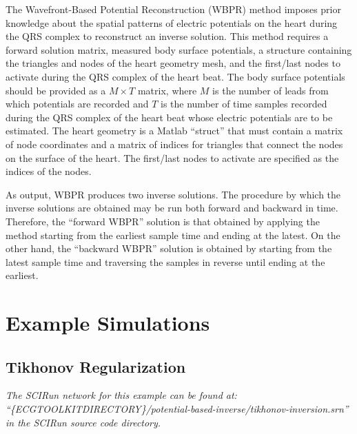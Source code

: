 The Wavefront-Based Potential Reconstruction (WBPR) method imposes prior knowledge about the spatial patterns of electric potentials on the heart during the QRS complex to reconstruct an inverse solution. This method requires a forward solution matrix, measured body surface potentials, a structure containing the triangles and nodes of the heart geometry mesh, and the first/last nodes to activate during the QRS complex of the heart beat. The body surface potentials should be provided as a $M \times T$ matrix, where $M$ is the number of leads from which potentials are recorded and $T$ is the number of time samples recorded during the QRS complex of the heart beat whose electric potentials are to be estimated. The heart geometry is a Matlab ``struct'' that must contain a matrix of node coordinates and a matrix of indices for triangles that connect the nodes on the surface of the heart. The first/last nodes to activate are specified as the indices of the nodes.

As output, WBPR produces two inverse solutions. The procedure by which the inverse solutions are obtained may be run both forward and backward in time. Therefore, the ``forward WBPR'' solution is that obtained by applying the method starting from the earliest sample time and ending at the latest. On the other hand, the ``backward WBPR'' solution is obtained by starting from the latest sample time and traversing the samples in reverse until ending at the earliest.


\section{Example Simulations}

\subsection{Tikhonov Regularization}

\vspace{5pt}\textit{The SCIRun network for this example can be found at:\\``\{ECGTOOLKITDIRECTORY\}/potential-based-inverse/tikhonov-inversion.srn''\\in the SCIRun source code directory.}\vspace{5pt}

